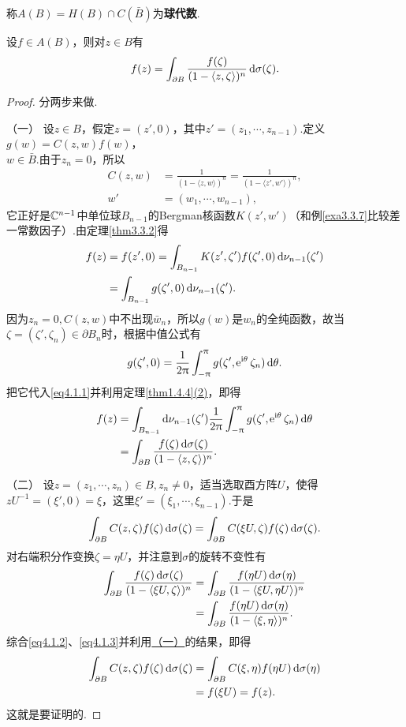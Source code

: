 称$A(B)=H(B)\cap C(\bar{B})$为\textbf{球代数}.
\begin{theorem}[（Cauchy积分公式）]\label{thm4.1.1}
	设$f\in A(B)$，则对$z\in B$有
	\[f(z)=\int_{\partial B}\frac{f(\zeta)}{(1-\langle z,\zeta\rangle)^n}\mathop{}\!\mathrm{d}\sigma(\zeta).\]
\end{theorem}
\begin{proof}
	分两步来做.
	
	（一）\hypertarget{4.1.1}{}
	设$z\in B$，假定$z=(z',0)$，其中$z'=(z_1,\cdots,z_{n-1})$.定义$g(w)=C(z,w)f(w)$，\\
	$w\in\bar{B}$.由于$z_n=0$，所以
	\begin{align*}
		C(z,w)
		&=\frac1{(1-\langle z,w\rangle)^n}=\frac1{(1-\langle z',w'\rangle)^n},\\
		w'&=(w_1,\cdots,w_{n-1}),
	\end{align*}
它正好是$\mathbb C^{n-1}$中单位球$B_{n-1}$的Bergman核函数$K(z',w')$（和例\ref{exa3.3.7}比较差一常数因子）.由定理\ref{thm3.3.2}得
\begin{align}\label{eq4.1.1}
	f(z)
	&=f(z',0)=\int_{B_{n-1}}K(z',\zeta')f(\zeta',0)\mathop{}\!\mathrm{d}\nu_{n-1}(\zeta')\notag\\
	&=\int_{B_{n-1}}g(\zeta',0)\mathop{}\!\mathrm{d}\nu_{n-1}(\zeta').
\end{align}
因为$z_n=0,C(z,w)$中不出现$\bar{w}_n$，所以$g(w)$是$w_n$的全纯函数，故当$\zeta=(\zeta',\zeta_n)\in\partial B_n$时，根据中值公式有
\[g(\zeta',0)=\frac1{2\uppi}\int_{-\uppi}^{\uppi}g(\zeta',\operatorname{\!\!\;\mathrm e}^{\mathrm i\theta}\zeta_n)\mathop{}\!\mathrm{d}\theta.\]
把它代入\eqref{eq4.1.1}并利用定理\ref{thm1.4.4}\hyperlink{1.4.4}{(2)}，即得
\begin{align*}
	f(z)
	&=\int_{B_{n-1}}\mathop{}\!\mathrm{d}\nu_{n-1}(\zeta')\frac1{2\uppi}\int_{-\uppi}^{\uppi}g(\zeta',\operatorname{\!\!\;\mathrm e}^{\mathrm i\theta}\zeta_n)\mathop{}\!\mathrm{d}\theta\\
	&=\int_{\partial B}\frac{f(\zeta)\mathop{}\!\mathrm{d}\sigma(\zeta)}{(1-\langle z,\zeta\rangle)^n}.
\end{align*}

（二）\hypertarget{4.1.1}{}
设$z=(z_1,\cdots,z_n)\in B,z_n\neq0$，适当选取酉方阵$U$，使得$zU^{-1}=(\xi',0)=\xi$，这里$\xi'=(\xi_1,\cdots,\xi_{n-1})$.于是
\begin{equation}\label{eq4.1.2}
	\int_{\partial B}C(z,\zeta)f(\zeta)\mathop{}\!\mathrm{d}\sigma(\zeta)=\int_{\partial B} C(\xi U,\zeta)f(\zeta)\mathop{}\!\mathrm{d}\sigma(\zeta).
\end{equation}
对右端积分作变换$\zeta=\eta U$，并注意到$\sigma$的旋转不变性有
\begin{align}\label{eq4.1.3}
	\int_{\partial B}\frac{f(\zeta)\mathop{}\!\mathrm{d}\sigma(\zeta)}{(1-\langle \xi U,\zeta\rangle)^n}
	&=\int_{\partial B}\frac{f(\eta U)\mathop{}\!\mathrm{d}\sigma(\eta)}{(1-\langle\xi U,\eta U\rangle)^n}\notag\\
	&=\int_{\partial B}\frac{f(\eta U)\mathop{}\!\mathrm{d}\sigma(\eta)}{(1-\langle\xi,\eta\rangle)^n}.
\end{align}
综合\eqref{eq4.1.2}、\eqref{eq4.1.3}并利用\hyperlink{4.1.1}{（一）}的结果，即得
\begin{align*}
	\int_{\partial B}C(z,\zeta)f(\zeta)\mathop{}\!\mathrm{d}\sigma(\zeta)
	&=\int_{\partial B}C(\xi,\eta)f(\eta U)\mathop{}\!\mathrm{d}\sigma(\eta)\\
	&=f(\xi U)=f(z).
\end{align*}
这就是要证明的.
\end{proof}
